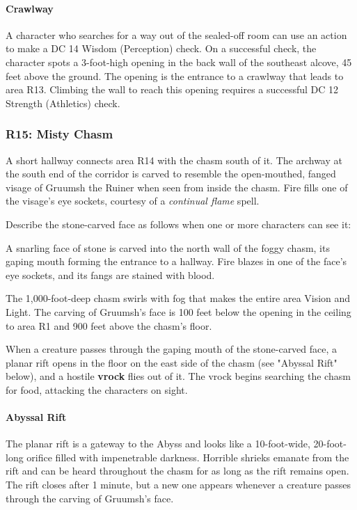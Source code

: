 \documentclass[letterpaper, 11pt, bg=full, twocolumn]{dndbook}
\begin{document}
\paragraph{Crawlway}

A character who searches for a way out of the sealed-off room can use an action to make a DC 14 Wisdom (Perception) check. On a successful check, the character spots a 3-foot-high opening in the back wall of the southeast alcove, 45 feet above the ground. The opening is the entrance to a crawlway that leads to area R13. Climbing the wall to reach this opening requires a successful DC 12 Strength (Athletics) check.

\subsubsection{R15: Misty Chasm}

A short hallway connects area R14 with the chasm south of it. The archway at the south end of the corridor is carved to resemble the open-mouthed, fanged visage of Gruumsh the Ruiner when seen from inside the chasm. Fire fills one of the visage's eye sockets, courtesy of a \textit{continual flame} spell.

Describe the stone-carved face as follows when one or more characters can see it:

\begin{DndReadAloud}
A snarling face of stone is carved into the north wall of the foggy chasm, its gaping mouth forming the entrance to a hallway. Fire blazes in one of the face's eye sockets, and its fangs are stained with blood.
\end{DndReadAloud}

The 1,000-foot-deep chasm swirls with fog that makes the entire area Vision and Light. The carving of Gruumsh's face is 100 feet below the opening in the ceiling to area R1 and 900 feet above the chasm's floor.

When a creature passes through the gaping mouth of the stone-carved face, a planar rift opens in the floor on the east side of the chasm (see "Abyssal Rift" below), and a hostile \textbf{vrock} flies out of it. The vrock begins searching the chasm for food, attacking the characters on sight.

\paragraph{Abyssal Rift}

The planar rift is a gateway to the Abyss and looks like a 10-foot-wide, 20-foot-long orifice filled with impenetrable darkness. Horrible shrieks emanate from the rift and can be heard throughout the chasm for as long as the rift remains open. The rift closes after 1 minute, but a new one appears whenever a creature passes through the carving of Gruumsh's face.
\end{document}
